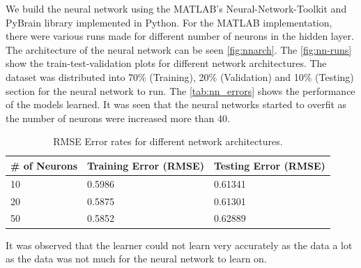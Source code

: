 \documentclass[a4paper]{article}
\begin{document}
We build the neural network using the MATLAB's Neural-Network-Toolkit and PyBrain library implemented in Python. For the MATLAB implementation, there were various runs made for different number of neurons in the hidden layer. The architecture of the neural network can be seen \autoref{fig:nnarch}. The \autoref{fig:nn-runs} show the train-test-validation plots for different network architectures. The dataset was distributed into 70\% (Training), 20\% (Validation) and 10\% (Testing) section for the neural network to run. The \autoref{tab:nn_errors} shows the performance of the models learned. It was seen that the neural networks started to overfit as the number of neurons were increased more than 40.%

\begin{table}[h]
\centering
\begin{tabular}{ | l | l | l |}
\hline
\# of Neurons & Training Error (RMSE) & Testing Error (RMSE) \\ \hline
10 & 0.5986 & 0.61341 \\ \hline
20 & 0.5875 & 0.61301 \\ \hline
50 & 0.5852 & 0.62889 \\ \hline
\end{tabular}
\label{tab:nn_errors}
\caption{RMSE Error rates for different network architectures.}
\end{table}

It was observed that the learner could not learn very accurately as the data a lot as the data was not much for the neural network to learn on.
\end{document}
